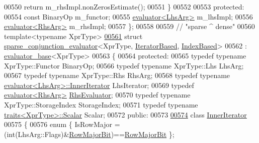 \begin{DoxyCode}
00550     \textcolor{keywordflow}{return} m\_rhsImpl.nonZerosEstimate();
00551   \}
00552 
00553 \textcolor{keyword}{protected}:
00554   \textcolor{keyword}{const} BinaryOp m\_functor;
00555   \hyperlink{struct_eigen_1_1internal_1_1evaluator}{evaluator<LhsArg>} m\_lhsImpl;
00556   \hyperlink{struct_eigen_1_1internal_1_1evaluator}{evaluator<RhsArg>} m\_rhsImpl;
00557 \};
00558 
00559 \textcolor{comment}{// "sparse ^ dense"}
00560 \textcolor{keyword}{template}<\textcolor{keyword}{typename} XprType>
\hyperlink{struct_eigen_1_1internal_1_1sparse__conjunction__evaluator_3_01_xpr_type_00_01_iterator_based_00_01_index_based_01_4}{00561} \textcolor{keyword}{struct }\hyperlink{struct_eigen_1_1internal_1_1sparse__conjunction__evaluator}{sparse\_conjunction\_evaluator}<XprType, 
      \hyperlink{struct_eigen_1_1internal_1_1_iterator_based}{IteratorBased}, \hyperlink{struct_eigen_1_1internal_1_1_index_based}{IndexBased}>
00562   : \hyperlink{struct_eigen_1_1internal_1_1evaluator__base}{evaluator\_base}<XprType>
00563 \{
00564 \textcolor{keyword}{protected}:
00565   \textcolor{keyword}{typedef} \textcolor{keyword}{typename} XprType::Functor BinaryOp;
00566   \textcolor{keyword}{typedef} \textcolor{keyword}{typename} XprType::Lhs LhsArg;
00567   \textcolor{keyword}{typedef} \textcolor{keyword}{typename} XprType::Rhs RhsArg;
00568   \textcolor{keyword}{typedef} \textcolor{keyword}{typename} \hyperlink{struct_eigen_1_1internal_1_1evaluator}{evaluator<LhsArg>::InnerIterator} LhsIterator;
00569   \textcolor{keyword}{typedef} \hyperlink{struct_eigen_1_1internal_1_1evaluator}{evaluator<RhsArg>} \hyperlink{struct_eigen_1_1internal_1_1evaluator}{RhsEvaluator};
00570   \textcolor{keyword}{typedef} \textcolor{keyword}{typename} XprType::StorageIndex StorageIndex;
00571   \textcolor{keyword}{typedef} \textcolor{keyword}{typename} \hyperlink{struct_eigen_1_1internal_1_1traits}{traits<XprType>::Scalar} Scalar;
00572 \textcolor{keyword}{public}:
00573 
\hyperlink{class_eigen_1_1internal_1_1sparse__conjunction__evaluator_3_01_xpr_type_00_01_iterator_based_00_a6ef5c4f649d544c873e35b2b7e6dc62}{00574}   \textcolor{keyword}{class }\hyperlink{class_eigen_1_1_inner_iterator}{InnerIterator}
00575   \{
00576     \textcolor{keyword}{enum} \{ IsRowMajor = (int(LhsArg::Flags)&\hyperlink{group__flags_gae4f56c2a60bbe4bd2e44c5b19cbe8762}{RowMajorBit})==\hyperlink{group__flags_gae4f56c2a60bbe4bd2e44c5b19cbe8762}{RowMajorBit} \};

\end{DoxyCode}

